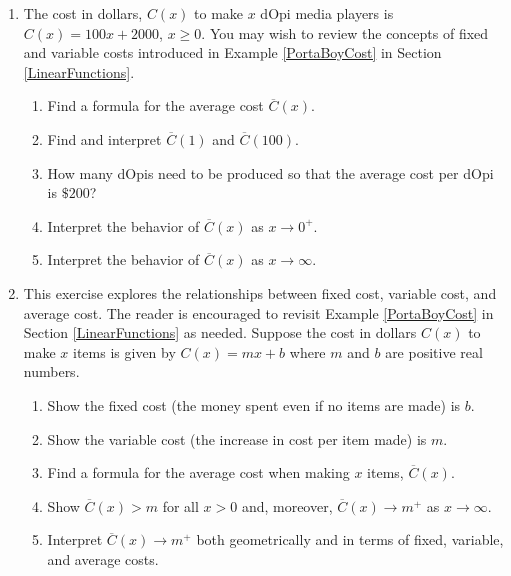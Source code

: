 \begin{enumerate}
\item  The cost in dollars, $C(x)$ to make $x$ dOpi media players is $C(x) = 100x+2000$, $x \geq 0$.  You may wish to review the concepts of fixed and variable costs introduced in  Example \ref{PortaBoyCost} in Section \ref{LinearFunctions}.

\begin{enumerate}

\item  Find a formula for the average cost $\overline{C}(x)$.

\item  Find and interpret $\overline{C}(1)$ and $\overline{C}(100)$.

\item  How many dOpis need to be produced so that the average cost per dOpi is $\$ 200$?

\item  Interpret the behavior of $\overline{C}(x)$ as $x \rightarrow 0^{+}$.  

\item  Interpret the behavior of $\overline{C}(x)$ as $x \rightarrow \infty$.  

\end{enumerate}

\item  \label{averagevariablecostexercise}   This exercise explores the relationships between fixed cost, variable cost, and average cost.  The reader is encouraged to revisit Example \ref{PortaBoyCost} in Section \ref{LinearFunctions} as needed.  Suppose the cost in dollars $C(x)$ to make $x$ items is given by $C(x) = mx + b$ where $m$ and $b$ are positive real numbers.

\begin{enumerate}

\item  Show the fixed cost (the money spent even if no items are made) is $b$.
\item  Show the variable cost (the increase in cost per item made) is $m$.
\item  Find a formula for the average cost when making $x$ items, $\overline{C}(x)$.
\item  Show $\overline{C}(x) > m$ for all $x>0$ and, moreover,   $\overline{C}(x)  \rightarrow m^{+}$ as $x \rightarrow \infty$. 
\item  Interpret $\overline{C}(x)  \rightarrow m^{+}$ both geometrically and in terms of fixed, variable, and average costs.

\end{enumerate}


\end{enumerate}
